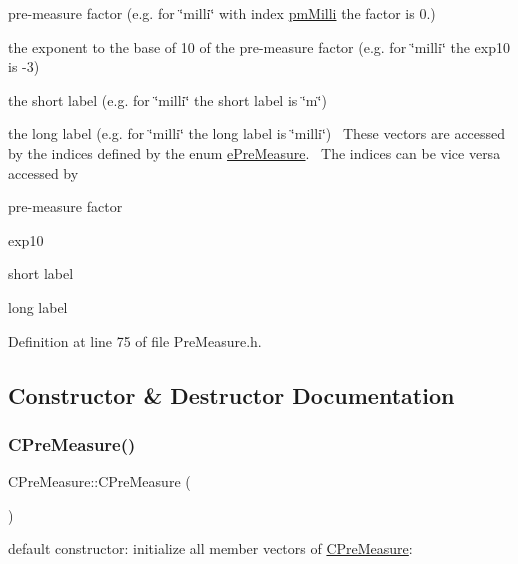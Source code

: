 \begin{DoxyItemize}
\item pre-\/measure factor (e.\+g. for \char`\"{}milli\char`\"{} with index \hyperlink{PreMeasure_8h_a6c81167b8d4c2badde42f81cb7214620aff93812e5c2f401cb10fe430a1d341f4}{pm\+Milli} the factor is 0.)
\item the exponent to the base of 10 of the pre-\/measure factor (e.\+g. for \char`\"{}milli\char`\"{} the exp10 is -\/3)
\item the short label (e.\+g. for \char`\"{}milli\char`\"{} the short label is \char`\"{}m\char`\"{})
\item the long label (e.\+g. for \char`\"{}milli\char`\"{} the long label is \char`\"{}milli\char`\"{})~\newline
 These vectors are accessed by the indices defined by the enum \hyperlink{PreMeasure_8h_a6c81167b8d4c2badde42f81cb7214620}{e\+Pre\+Measure}.~\newline
 The indices can be vice versa accessed by
\item pre-\/measure factor
\item exp10
\item short label
\item long label 
\end{DoxyItemize}

Definition at line 75 of file Pre\+Measure.\+h.



\subsection{Constructor \& Destructor Documentation}
\mbox{\label{classCPreMeasure_acf40211e2818677f65b85f2db360c001}} 
\subsubsection{\texorpdfstring{C\+Pre\+Measure()}{CPreMeasure()}}
{\footnotesize\ttfamily C\+Pre\+Measure\+::\+C\+Pre\+Measure (\begin{DoxyParamCaption}{ }\end{DoxyParamCaption})}



default constructor\+: initialize all member vectors of \hyperlink{classCPreMeasure}{C\+Pre\+Measure}\+: 


